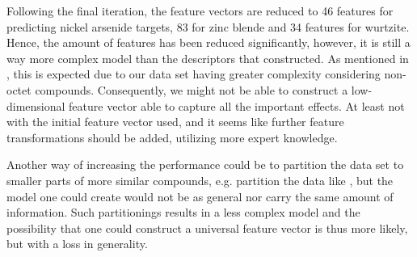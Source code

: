 Following the final iteration, the feature vectors are reduced to 46 features for predicting nickel arsenide targets, 83 for zinc blende and 34 features for wurtzite. Hence, the amount of features has been reduced significantly, however, it is still a way more complex model than the descriptors that \citep{criticalrole_descriptor} constructed.  As mentioned in , this is expected due to our data set having greater complexity considering non-octet compounds. Consequently, we might not be able to construct a low-dimensional feature vector able to capture all the important effects. At least not with the initial feature vector used, and it seems like further feature transformations should be added, utilizing more expert knowledge.
 
Another way of increasing the performance could be to partition the data set to smaller parts of more similar compounds, e.g. partition the data like \citep{criticalrole_descriptor}, but the model one could create would not be as general nor carry the same amount of information. Such partitionings results in a less complex model and the possibility that one could construct a universal feature vector is thus more likely, but with a loss in generality.
 
